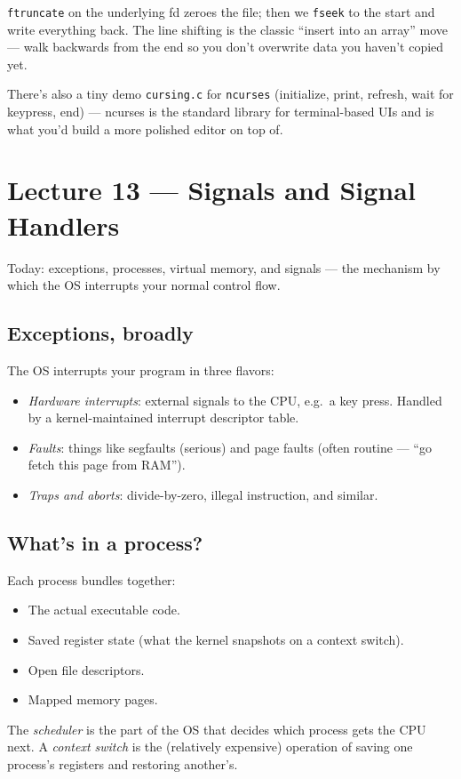 \documentclass[11pt]{article}
\begin{document}
\texttt{ftruncate} on the underlying fd zeroes the file; then we
\texttt{fseek} to the start and write everything back. The line
shifting is the classic ``insert into an array'' move --- walk
backwards from the end so you don't overwrite data you haven't
copied yet.

There's also a tiny demo \texttt{cursing.c} for \texttt{ncurses}
(initialize, print, refresh, wait for keypress, end) --- ncurses is
the standard library for terminal-based UIs and is what you'd
build a more polished editor on top of.

\section{Lecture 13 --- Signals and Signal Handlers}

Today: exceptions, processes, virtual memory, and signals --- the
mechanism by which the OS interrupts your normal control flow.

\subsection*{Exceptions, broadly}

The OS interrupts your program in three flavors:
\begin{itemize}
  \item \emph{Hardware interrupts}: external signals to the CPU,
    e.g.\ a key press. Handled by a kernel-maintained interrupt
    descriptor table.
  \item \emph{Faults}: things like segfaults (serious) and page
    faults (often routine --- ``go fetch this page from RAM'').
  \item \emph{Traps and aborts}: divide-by-zero, illegal
    instruction, and similar.
\end{itemize}

\subsection*{What's in a process?}

Each process bundles together:
\begin{itemize}
  \item The actual executable code.
  \item Saved register state (what the kernel snapshots on a context
    switch).
  \item Open file descriptors.
  \item Mapped memory pages.
\end{itemize}
The \emph{scheduler} is the part of the OS that decides which
process gets the CPU next. A \emph{context switch} is the (relatively
expensive) operation of saving one process's registers and
restoring another's.
\end{document}
